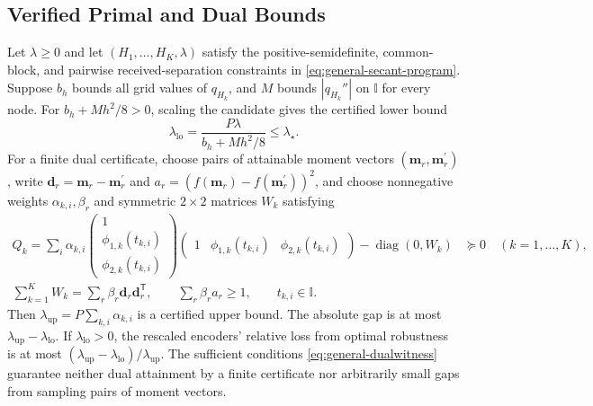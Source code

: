 \documentclass[journal,12pt,onecolumn,draftclsnofoot]{IEEEtran}
\newcommand{\T}{\mathsf T}\newcommand{\suc}{\succeq}
\begin{document}
\subsection{Verified Primal and Dual Bounds}\label{app:certificate-witness-bounds}

Let $\lambda\ge0$ and let $(H_1,\ldots,H_K,\lambda)$ satisfy the positive-semidefinite,
common-block, and pairwise received-separation constraints in \eqref{eq:general-secant-program}. Suppose $b_h$ bounds
all grid values of $q_{H_k}$, and $M$ bounds $|q_{H_k}''|$ on
$\mathbb I$ for every node. For $b_h+Mh^2/8>0$, scaling the
candidate gives the certified lower bound
$$
\lambda_{\mathrm{lo}}=\frac{P\lambda}{b_h+Mh^2/8}\le\lambda_\star.
$$
For a finite dual certificate, choose pairs of attainable moment vectors
$(\boldsymbol m_r,\boldsymbol m_r^{\prime})$, write
$\boldsymbol d_r=\boldsymbol m_r-\boldsymbol m_r^{\prime}$ and
$a_r=(f(\boldsymbol m_r)-f(\boldsymbol m_r^{\prime}))^2$, and choose
nonnegative weights $\alpha_{k,i},\beta_r$ and symmetric $2\times2$ matrices
$W_k$ satisfying
\begin{align}
\nonumber
Q_k=\sum_i\alpha_{k,i}
\begin{pmatrix}1\\\phi_{1,k}(t_{k,i})\\\phi_{2,k}(t_{k,i})\end{pmatrix}
\begin{pmatrix}1&\phi_{1,k}(t_{k,i})&\phi_{2,k}(t_{k,i})\end{pmatrix}-\operatorname{diag}(0,W_k)&\succeq0
\quad(k=1,\ldots,K),\\
\sum_{k=1}^K W_k=\sum_r\beta_r\boldsymbol d_r\boldsymbol d_r^\T,
\qquad \sum_r\beta_r a_r\ge1,
\qquad t_{k,i}\in\mathbb I.&
\label{eq:general-dualwitness}
\end{align}
Then ${ \lambda_{\mathrm{up}}}=P\sum_{k,i}\alpha_{k,i}$ is a certified upper bound.
The absolute gap is at most $\lambda_{\mathrm{up}}-\lambda_{\mathrm{lo}}$.
If $\lambda_{\mathrm{lo}}>0$, the rescaled encoders' relative loss from optimal robustness is at most
$(\lambda_{\mathrm{up}}-\lambda_{\mathrm{lo}})/\lambda_{\mathrm{up}}$.
The sufficient conditions \eqref{eq:general-dualwitness} guarantee neither dual attainment by a finite certificate nor arbitrarily small gaps from sampling pairs of moment vectors.
\end{document}
